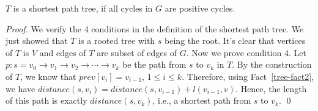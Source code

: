 \begin{claim}
$T$ is a shortest path tree, if all cycles in $G$ are positive cycles.

\end{claim}
\emph{Proof.} We verify the 4 conditions in the definition of the shortest path tree.
We just showed that $T$ is a rooted tree with $s$ being the root.
It's clear that vertices of $T$ is $V$ and edges of $T$ are subset of edges of $G$.
Now we prove condition 4. Let $p: s = v_0 \to v_1 \to v_2 \to \cdots \to v_k$ be the path from $s$ to $v_k$ in $T$.
By the construction of $T$, we know that $prev[v_i] = v_{i - 1}$, $1\le i \le k$.
Therefore, using Fact~\ref{tree-fact2}, we have $distance(s, v_i) = distance(s, v_{i-1}) + l(v_{i-1}, v)$.
Hence, the length of this path is exactly $distance(s,v_k)$, i.e., a shortest path from $s$ to $v_k$. \qed



